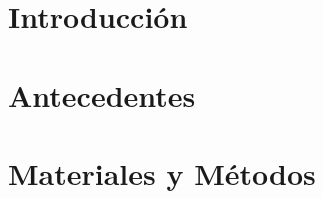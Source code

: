 \documentclass{beamer}
\title{\tituloTesis}
\author{Juan Manuel Pérez}
\begin{document}
\beamertemplatenavigationsymbolsempty


\frame{\titlepage}






\section{Introducción}



\section{Antecedentes}




\section{Materiales y Métodos}

\end{document}
